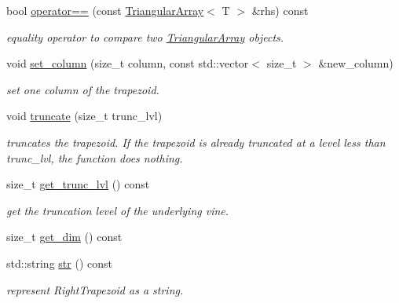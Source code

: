 \begin{DoxyCompactItemize}
bool \hyperlink{classvinecopulib_1_1_triangular_array_a2bb6d8ef421bbcef635970000b072727}{operator==} (const \hyperlink{classvinecopulib_1_1_triangular_array}{Triangular\+Array}$<$ T $>$ \&rhs) const
\begin{DoxyCompactList}\small\item\em equality operator to compare two \hyperlink{classvinecopulib_1_1_triangular_array}{Triangular\+Array} objects. \end{DoxyCompactList}\item 
void \hyperlink{classvinecopulib_1_1_triangular_array_ae9d39595702831aca33b981ef7687a1d}{set\+\_\+column} (size\+\_\+t column, const std\+::vector$<$ size\+\_\+t $>$ \&new\+\_\+column)
\begin{DoxyCompactList}\small\item\em set one column of the trapezoid. \end{DoxyCompactList}\item 
void \hyperlink{classvinecopulib_1_1_triangular_array_ab6d8130336a957271b1db9018781e69a}{truncate} (size\+\_\+t trunc\+\_\+lvl)
\begin{DoxyCompactList}\small\item\em truncates the trapezoid. If the trapezoid is already truncated at a level less than {\ttfamily trunc\+\_\+lvl}, the function does nothing. \end{DoxyCompactList}\item 
\mbox{\label{classvinecopulib_1_1_triangular_array_ae557ebefe25bfc18818e254ada5c91cb}} 
size\+\_\+t \hyperlink{classvinecopulib_1_1_triangular_array_ae557ebefe25bfc18818e254ada5c91cb}{get\+\_\+trunc\+\_\+lvl} () const
\begin{DoxyCompactList}\small\item\em get the truncation level of the underlying vine. \end{DoxyCompactList}\item 
size\+\_\+t \hyperlink{classvinecopulib_1_1_triangular_array_adb36a7916d7281707dcf50e40839bfb9}{get\+\_\+dim} () const
\item 
\mbox{\label{classvinecopulib_1_1_triangular_array_a2cd9d9617c7c3fc422ed67a6054b2d3a}} 
std\+::string \hyperlink{classvinecopulib_1_1_triangular_array_a2cd9d9617c7c3fc422ed67a6054b2d3a}{str} () const
\begin{DoxyCompactList}\small\item\em represent Right\+Trapezoid as a string. \end{DoxyCompactList}\end{DoxyCompactItemize}


